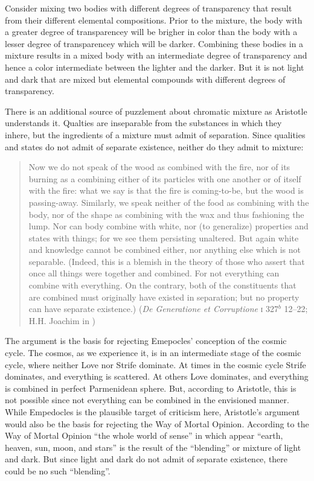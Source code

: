 Consider mixing two bodies with different degrees of transparency that result from their different elemental compositions. Prior to the mixture, the body with a greater degree of transparencey will be brigher in color than the body with a lesser degree of transparencey which will be darker. Combining these bodies in a mixture results in a mixed body with an intermediate degree of transparency and hence a color intermediate between the lighter and the darker. But it is not light and dark that are mixed but elemental compounds with different degrees of transparency. 

There is an additional source of puzzlement about chromatic mixture as Aristotle understands it. Qualties are inseparable from the substances in which they inhere, but the ingredients of a mixture must admit of separation. Since qualities and states do not admit of separate existence, neither do they admit to mixture:
\begin{quote}
	Now we do not speak of the wood as combined with the fire, nor of its burning as a combining either of its particles with one another or of itself with the fire: what we say is that the fire is coming-to-be, but the wood is passing-away. Similarly, we speak neither of the food as combining with the body, nor of the shape as combining with the wax and thus fashioning the lump. Nor can body combine with white, nor (to generalize) properties and states with things; for we see them persisting unaltered. But again white and knowledge cannot be combined either, nor anything else which is not separable. (Indeed, this is a blemish in the theory of those who assert that once all things were together and combined. For not everything can combine with everything. On the contrary, both of the constituents that are combined must originally have existed in separation; but no property can have separate existence.) (\emph{De Generatione et Corruptione} \textsc{i} 327\( ^{b} \) 12--22; H.H. Joachim in \citealt[30--31]{Barnes:1984kx})
\end{quote}
The argument is the basis for rejecting Emepocles' conception of the cosmic cycle. The cosmos, as we experience it, is in an intermediate stage of the cosmic cycle, where neither Love nor Strife dominate. At times in the cosmic cycle Strife dominates, and everything is scattered. At others Love dominates, and everything is combined in perfect Parmenidean sphere. But, according to Aristotle, this is not possible since not everything can be combined in the envisioned manner. While Empedocles is the plausible target of criticism here, Aristotle's argument would also be the basis for rejecting the Way of Mortal Opinion. According to the Way of Mortal Opinion “the whole world of sense” in which appear “earth, heaven, sun, moon, and stars” is the result of the ``blending'' or mixture of light and dark. But since light and dark do not admit of separate existence, there could be no such ``blending''. 

